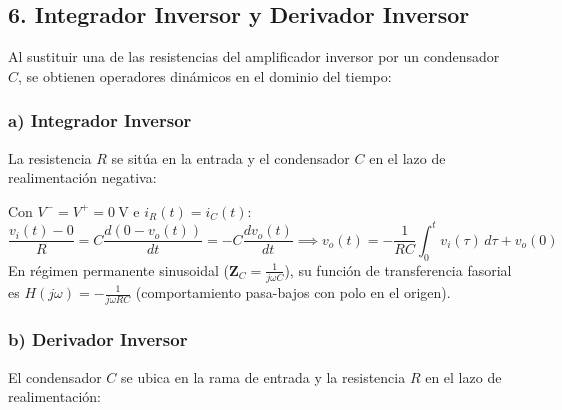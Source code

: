 \subsection{6. Integrador Inversor y Derivador Inversor}

Al sustituir una de las resistencias del amplificador inversor por un condensador $C$, se obtienen operadores dinámicos en el dominio del tiempo:

\subsubsection{a) Integrador Inversor}
La resistencia $R$ se sitúa en la entrada y el condensador $C$ en el lazo de realimentación negativa:

\begin{center}
\end{center}

Con $V^- = V^+ = 0\ \si{\volt}$ e $i_R(t) = i_C(t)$:
\begin{equation}
    \frac{v_i(t) - 0}{R} = C \frac{d(0 - v_o(t))}{dt} = -C \frac{dv_o(t)}{dt} \implies \boxed{v_o(t) = -\frac{1}{R C} \int_0^t v_i(\tau)\, d\tau + v_o(0)}
\end{equation}
En régimen permanente sinusoidal ($\mathbf{Z}_C = \frac{1}{j\omega C}$), su función de transferencia fasorial es $H(j\omega) = -\frac{1}{j\omega R C}$ (comportamiento pasa-bajos con polo en el origen).

\subsubsection{b) Derivador Inversor}
El condensador $C$ se ubica en la rama de entrada y la resistencia $R$ en el lazo de realimentación:

\begin{center}
\end{center}

